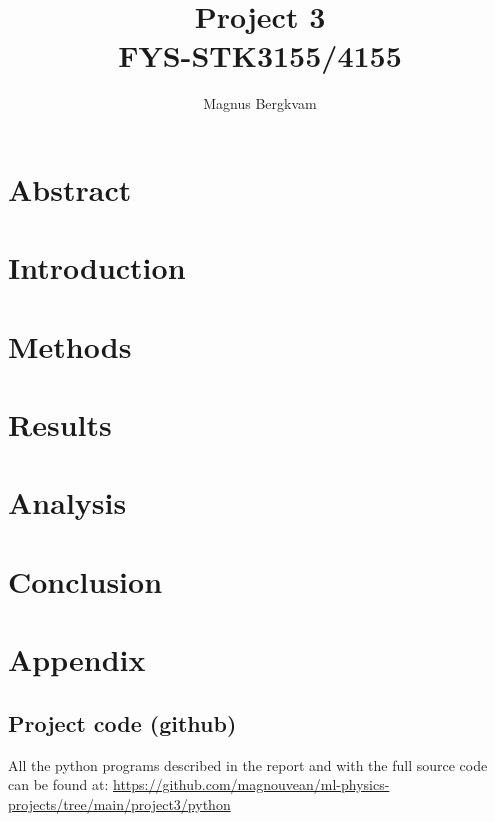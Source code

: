 \documentclass{article}
\title{Project 3 \\ FYS-STK3155/4155}
\author{Magnus Bergkvam}
\begin{document}
\maketitle


\section{Abstract}

\section{Introduction}

\section{Methods}

\section{Results}

\section{Analysis}

\section{Conclusion}

\section{Appendix}

\subsection{Project code (github)}
All the python programs described in the report and with the full source code can be
found at:
\url{https://github.com/magnouvean/ml-physics-projects/tree/main/project3/python}


\end{document}
